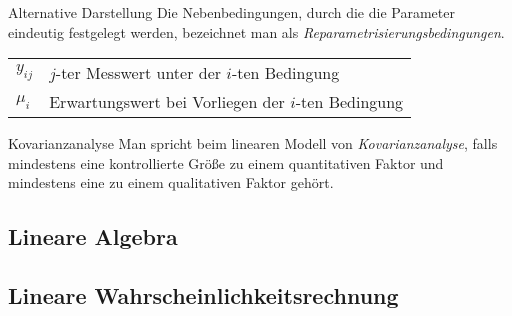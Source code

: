 \begin{defi}{Alternative Darstellung}
    Die Nebenbedingungen, durch die die Parameter eindeutig festgelegt werden, bezeichnet man als \emph{Reparametrisierungsbedingungen}.

    \tcbline

    \begin{tabularx}{\linewidth}{lX}
        $y_{ij}$ & $j$-ter Messwert unter der $i$-ten Bedingung       \\
        $\mu_i$  & Erwartungswert bei Vorliegen der $i$-ten Bedingung
    \end{tabularx}
\end{defi}



\begin{defi}{Kovarianzanalyse}
    Man spricht beim linearen Modell von \emph{Kovarianzanalyse}, falls mindestens eine kontrollierte Größe zu einem quantitativen Faktor und mindestens eine zu einem qualitativen Faktor gehört.
\end{defi}


\subsection{Lineare Algebra}

\subsection{Lineare Wahrscheinlichkeitsrechnung}
